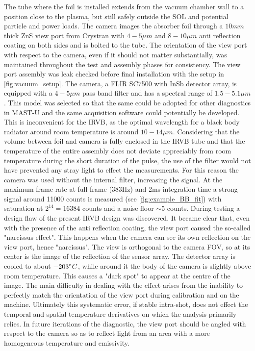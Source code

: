 The tube where the foil is installed extends from the vacuum chamber wall to a position close to the plasma, but still safely outside the SOL and potential particle and power loads. The camera images the absorber foil through a $10mm$ thick ZnS view port from Crystran with $4-5 \mu m$ and $8-10 \mu m$ anti reflection coating on both sides and is bolted to the tube. The orientation of the view port with respect to the camera, even if it should not matter substantially, was maintained throughout the test and assembly phases for consistency. The view port assembly was leak checked before final installation with the setup in \autoref{fig:vacuum_setup}. 
The camera, a FLIR SC7500 with InSb detector array, is equipped with a $4-5\mu m$ pass band filter and has a spectral range of $1.5-5.1\mu m$. This model was selected so that the same could be adopted for other diagnostics in MAST-U and the same acquisition software could potentially be developed. This is inconvenient for the IRVB, as the optimal wavelength for a black body radiator around room temperature is around $10-14\mu m$. Considering that the volume between foil and camera is fully enclosed in the IRVB tube and that the temperature of the entire assembly does not deviate appreciably from room temperature during the short duration of the pulse, the use of the filter would not have prevented any stray light to effect the measurements. For this reason the camera was used without the internal filter, increasing the signal. At the maximum frame rate at full frame (383Hz) and 2ms integration time a strong signal around 11000 counts is measured (see \autoref{fig:example_BB_fit}) with saturation at $2^{14}=16384$ counts and a noise floor $\sim5$ counts.
During testing a design flaw of the present IRVB design was discovered. It became clear that, even with the presence of the anti reflection coating, the view port caused the so-called "narcissus effect". This happens when the camera can see its own reflection on the view port, hence "narcissus". The view is orthogonal to the camera FOV, so at its center is the image of the reflection of the sensor array. The detector array is cooled to about $-203\degree C$, while around it the body of the camera is slightly above room temperature. This causes a "dark spot" to appear at the centre of the image. The main difficulty in dealing with the effect arises from the inability to perfectly match the orientation of the view port during calibration and on the machine. Ultimately this systematic error, if stable intra-shot, does not effect the temporal and spatial temperature derivatives on which the analysis primarily relies. In future iterations of the diagnostic, the view port should be angled with respect to the camera so as to reflect light from an area with a more homogeneous temperature and emissivity.

